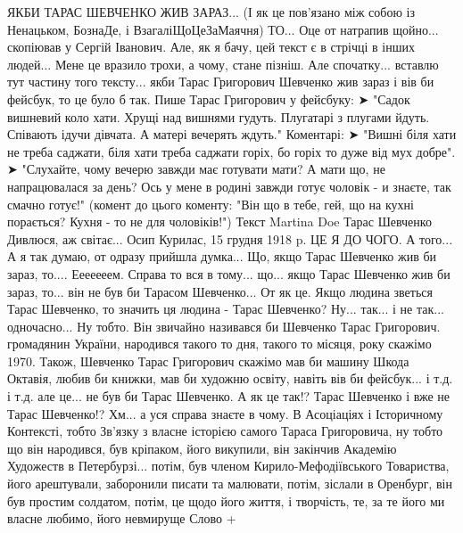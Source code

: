  
 
 
 
 

ЯКБИ ТАРАС ШЕВЧЕНКО ЖИВ ЗАРАЗ...
(І як це пов'язано між собою із Ненацьком, БознаДе, і ВзагаліЩоЦеЗаМаячня)
ТО...
Оце от натрапив щойно... скопіював у Сергій Іванович. Але, як я бачу, цей текст є в стрічці в інших людей... Мене це вразило трохи, а чому, стане пізніш. Але спочатку... вставлю тут частину того тексту... 
якби Тарас Григорович Шевченко жив зараз і вів би фейсбук, то це було б так. 
Пише Тарас Григорович у фейсбуку: 
➤
"Садок вишневий коло хати. 
Хрущі над вишнями гудуть. 
Плугатарі з плугами йдуть. 
Співають ідучи дівчата. 
А матері вечерять ждуть."
Коментарі: 
➤
"Вишні біля хати не треба саджати, біля хати треба саджати горіх, бо горіх то дуже від мух добре". 
➤
"Слухайте, чому вечерю завжди має готувати мати? А мати що, не напрацювалася за день? Ось у мене в родині завжди готує чоловік - и знаєте, так смачно готує!" 
(комент до цього коменту: "Він що в тебе, гей, що на кухні порається? Кухня - то не для чоловіків!")
Текст Martina Doe
Тарас Шевченко
Дивлюся, аж світає...
Осип Курилас, 15 грудня 1918 p.
ЦЕ Я ДО ЧОГО. 
А того... А я так думаю, от одразу прийшла думка... Що, якщо Тарас Шевченко жив би зараз, то....
Ееееееем. Справа то вся в тому... що... якщо Тарас Шевченко 
жив би зараз, то... він не був би Тарасом Шевченко... От як це. Якщо людина зветься Тарас Шевченко, то значить ця людина - Тарас Шевченко? Ну... так... і не так... одночасно...  Ну тобто. Він звичайно називався би Шевченко Тарас Григорович. громадянин України, народився такого то дня, такого то місяця, року скажімо 1970. Також, Шевченко Тарас Григорович
скажімо мав би машину Шкода Октавія, любив би книжки, мав би художню освіту, навіть вів би фейсбук... і т.д. і т.д. але це... не був би Тарас Шевченко. А як це так!? Тарас Шевченко і вже не Тарас Шевченко!?
Хм... а уся справа знаєте в чому. В Асоціаціях і Історичному Контексті, тобто Зв'язку з власне історією самого Тараса Григоровича, ну тобто що він народився, був кріпаком, його викупили, він закінчив Академію Художеств в Петербурзі... потім, був членом Кирило-Мефодіївського Товариства, його арештували, заборонили писати та малювати, потім, зіслали в Оренбург, він був простим солдатом, потім, це щодо його життя, і творчість, те, за те його ми власне любимо, його невмируще Слово +
